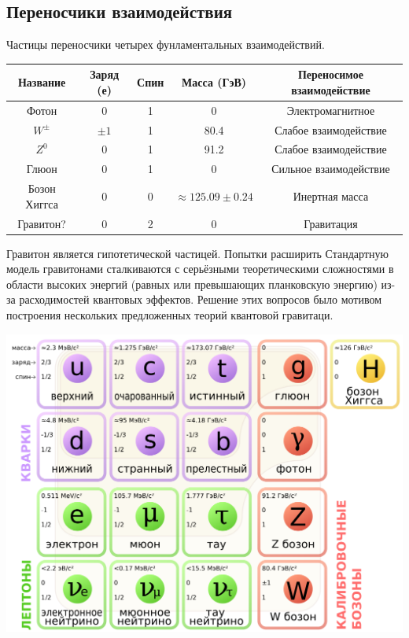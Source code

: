 \documentclass[a4paper,14pt]{article}
\begin{document}
\subsection*{Переносчики взаимодействия}

Частицы переносчики четырех фунламентальных взаимодействий. 
\begin{center}
\begin{tabular}{|c|c|c|c|c|}
\hline
Название&Заряд (е)&Спин&Масса (ГэВ)&Переносимое взаимодействие\\
\hline
Фотон&0&1&0&Электромагнитное\\
\hline
$W^{\pm}$&$\pm 1$&1&80.4&Слабое взаимодействие\\
\hline
$Z^0$&0&1&91.2&Слабое взаимодействие\\
\hline
Глюон&0&1&0&Сильное взаимодействие\\
\hline
Бозон Хиггса&0&0&$\approx 125.09 \pm 0.24$&Инертная масса\\
\hline
Гравитон?&0&2&0&Гравитация\\
\hline
\end{tabular}
\end{center}

Гравитон является гипотетической частицей. Попытки расширить Стандартную модель гравитонами сталкиваются с серьёзными теоретическими сложностями в области высоких энергий (равных или превышающих планковскую энергию) из-за расходимостей квантовых эффектов. Решение этих вопросов было мотивом построения нескольких предложенных теорий квантовой гравитаци.

\includegraphics[width=1\textwidth]{basic_particles.png}
\end{document}
